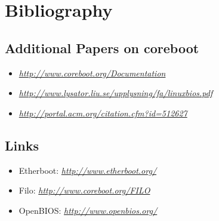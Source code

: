 \documentclass[titlepage,12pt]{article}
\begin{document}
\newpage

%
%

\section{Bibliography}
\subsection{Additional Papers on coreboot}

\begin{itemize}
 \item 
 \textit{\url{http://www.coreboot.org/Documentation}}
 \item 
 \textit{\url{http://www.lysator.liu.se/upplysning/fa/linuxbios.pdf}}
 \item 
 \textit{\url{http://portal.acm.org/citation.cfm?id=512627}}
\end{itemize}

\subsection {Links}

\begin{itemize}
 \item Etherboot: \textit{\url{http://www.etherboot.org/}}
 \item Filo: \textit{\url{http://www.coreboot.org/FILO}}
 \item OpenBIOS: \textit{\url{http://www.openbios.org/}}
\end{itemize}
\end{document}
